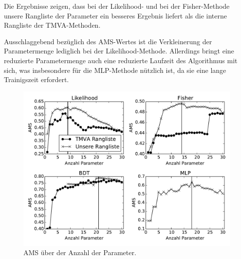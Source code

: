 Die Ergebnisse zeigen, dass bei der Likelihood- und bei der Fisher-Methode
unsere Rangliste der Parameter ein besseres Ergebnis liefert als die interne
Rangliste der TMVA-Methoden.

Ausschlaggebend bezüglich des AMS-Wertes ist die Verkleinerung der
Parametermenge lediglich bei der Likelihood-Methode. Allerdings bringt eine
reduzierte Parametermenge auch eine reduzierte Laufzeit des Algorithmus mit
sich, was insbesondere für die MLP-Methode nützlich ist, da sie eine lange
Trainigszeit erfordert.




\begin{figure}[htp]
\begin{center}
  \includegraphics[width=\linewidth]{sections/subset_of_parameters/parameter_count_ranking_by_method.pdf}
  \caption[AMS über der Anzahl der Parameter]{AMS über der Anzahl der Parameter.}
  \label{fig:ams_over_parameter_count}
\end{center}
\end{figure}

